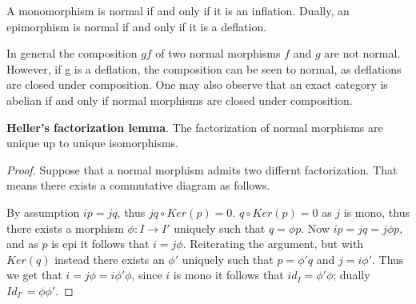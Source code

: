     \begin{remark}
        A monomorphism is normal if and only if it is an inflation. Dually, an epimorphism is normal if and only if it is a deflation.
    \end{remark}

    \begin{remark}
        In general the composition $gf$ of two normal morphisms $f$ and $g$ are not normal. However, if g is a deflation, the composition can be seen to normal, as deflations are closed under composition. One may also observe that an exact category is abelian if and only if normal morphisms are closed under composition.
    \end{remark}

    \begin{lemma}
        \textbf{Heller's factorization lemma}. The factorization of normal morphisms are unique up to unique isomorphisms.
    \end{lemma}

    \begin{proof}
        Suppose that a normal morphism admits two differnt factorization. That means there exists a commutative diagram as follows.
        \begin{center}
        \end{center}
        By assumption $ip=jq$, thus $jq\circ Ker(p)=0$. $q\circ Ker(p)=0$ as $j$ is mono, thus there exists a morphism $\phi:I\rightarrow I'$ uniquely such that $q=\phi p$. Now $ip=jq=j\phi p$, and as $p$ is epi it follows that $i=j\phi$. Reiterating the argument, but with $Ker(q)$ instead there exists an $\phi '$ uniquely such that $p = \phi 'q$ and $j=i\phi '$. Thus we get that $i=j\phi = i\phi '\phi$, since $i$ is mono it follows that $id_I=\phi '\phi$; dually $Id_{I'}=\phi\phi '$.
    \end{proof}

